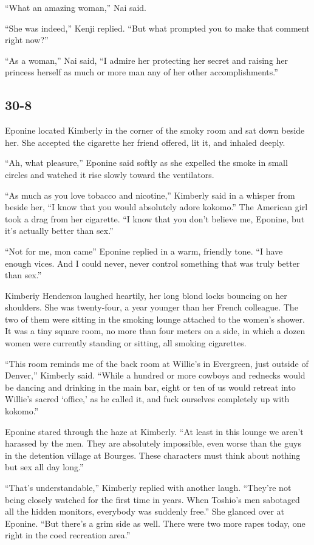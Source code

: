\documentclass[]{article}
\begin{document}
{“What an amazing woman,” Nai said.

“She was indeed,” Kenji replied. “But what prompted you to make that comment right now?”

“As a woman,” Nai said, “I admire her protecting her secret and raising her princess herself as much or more man any of her other accomplishments.”


\subsection{30-8}

Eponine located Kimberly in the corner of the smoky room and sat down beside her. She accepted the cigarette her friend offered, lit it, and inhaled deeply.

“Ah, what pleasure,” Eponine said softly as she expelled the smoke in small circles and watched it rise slowly toward the ventilators.

“As much as you love tobacco and nicotine,” Kimberly said in a whisper from beside her, “I know that you would absolutely adore kokomo.” The American girl took a drag from her cigarette. “I know that you don’t believe me, Eponine, but it’s actually better than sex.”

“Not for me, mon came” Eponine replied in a warm, friendly tone. “I have enough vices. And I could never, never control something that was truly better than sex.”

Kimberiy Henderson laughed heartily, her long blond locks bouncing on her shoulders. She was twenty-four, a year younger than her French colleague. The two of them were sitting in the smoking lounge attached to the women’s shower. It was a tiny square room, no more than four meters on a side, in which a dozen women were currently standing or sitting, all smoking cigarettes.

“This room reminds me of the back room at Willie’s in Evergreen, just outside of Denver,” Kimberly said. “While a hundred or more cowboys and rednecks would be dancing and drinking in the main bar, eight or ten of us would retreat into Willie’s sacred ‘office,’ as he called it, and fuck ourselves completely up with kokomo.”

Eponine stared through the haze at Kimberly. “At least in this lounge we aren’t harassed by the men. They are absolutely impossible, even worse than the guys in the detention village at Bourges. These characters must think about nothing but sex all day long.”

“That’s understandable,” Kimberly replied with another laugh. “They’re not being closely watched for the first time in years. When Toshio’s men sabotaged all the hidden monitors, everybody was suddenly free.” She glanced over at Eponine. “But there’s a grim side as well. There were two more rapes today, one right in the coed recreation area.”

}
\end{document}
